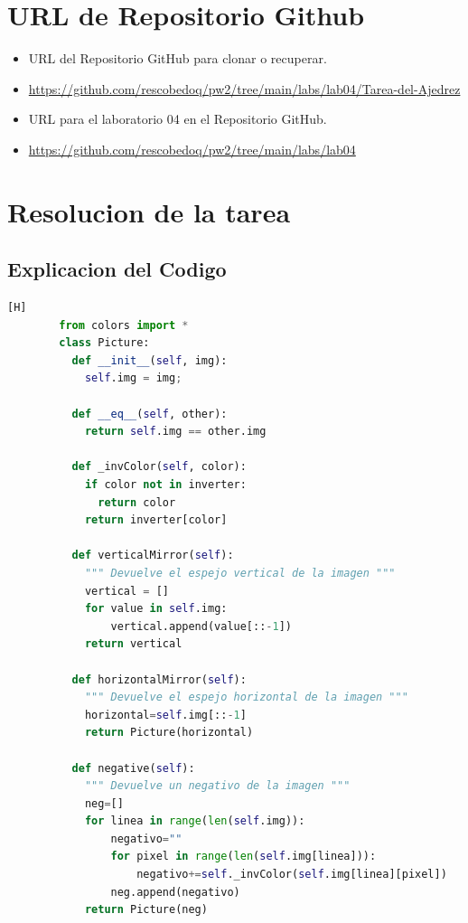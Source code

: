 \documentclass{article}
\begin{document}
\begin{itemize}
	\section{URL de Repositorio Github}
	\begin{itemize}
		\item URL del Repositorio GitHub para clonar o recuperar.
		\item \url{https://github.com/rescobedoq/pw2/tree/main/labs/lab04/Tarea-del-Ajedrez}
		\item URL para el laboratorio 04 en el Repositorio GitHub.
		\item \url{https://github.com/rescobedoq/pw2/tree/main/labs/lab04}
	\end{itemize}
	
	\section{Resolucion de la tarea}
	
	\subsection{Explicacion del Codigo}
    \begin{lstlisting}[language=python,caption={Clase Picture}][H]
        from colors import *
        class Picture:
          def __init__(self, img):
            self.img = img;
        
          def __eq__(self, other):
            return self.img == other.img
        
          def _invColor(self, color):
            if color not in inverter:
              return color
            return inverter[color]
        
          def verticalMirror(self):
            """ Devuelve el espejo vertical de la imagen """
            vertical = []
            for value in self.img:
            	vertical.append(value[::-1])
            return vertical
        
          def horizontalMirror(self):
            """ Devuelve el espejo horizontal de la imagen """
            horizontal=self.img[::-1]
            return Picture(horizontal)
        
          def negative(self):
            """ Devuelve un negativo de la imagen """
            neg=[]
            for linea in range(len(self.img)):
                negativo=""
                for pixel in range(len(self.img[linea])):
                    negativo+=self._invColor(self.img[linea][pixel])
                neg.append(negativo)
            return Picture(neg)
        

\end{lstlisting}
\end{itemize}
\end{document}
